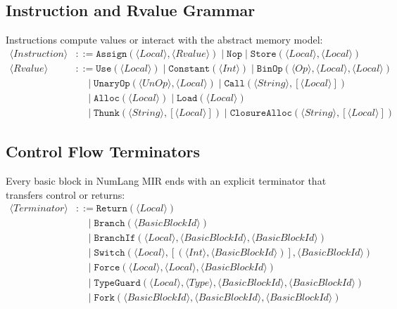 \subsection{Instruction and Rvalue Grammar}
Instructions compute values or interact with the abstract memory model:
\begin{align*}
\langle Instruction \rangle &::= \mathtt{Assign}(\langle Local \rangle, \langle Rvalue \rangle) \mid \mathtt{Nop} \mid \mathtt{Store}(\langle Local \rangle, \langle Local \rangle) \\
\langle Rvalue \rangle &::= \mathtt{Use}(\langle Local \rangle) \mid \mathtt{Constant}(\langle Int \rangle) \mid \mathtt{BinOp}(\langle Op \rangle, \langle Local \rangle, \langle Local \rangle) \\
&\quad\mid \mathtt{UnaryOp}(\langle UnOp \rangle, \langle Local \rangle) \mid \mathtt{Call}(\langle String \rangle, [\langle Local \rangle]) \\
&\quad\mid \mathtt{Alloc}(\langle Local \rangle) \mid \mathtt{Load}(\langle Local \rangle) \\
&\quad\mid \mathtt{Thunk}(\langle String \rangle, [\langle Local \rangle]) \mid \mathtt{ClosureAlloc}(\langle String \rangle, [\langle Local \rangle])
\end{align*}

\subsection{Control Flow Terminators}
Every basic block in NumLang MIR ends with an explicit terminator that transfers control or returns:
\begin{align*}
\langle Terminator \rangle &::= \mathtt{Return}(\langle Local \rangle) \\
&\quad\mid \mathtt{Branch}(\langle BasicBlockId \rangle) \\
&\quad\mid \mathtt{BranchIf}(\langle Local \rangle, \langle BasicBlockId \rangle, \langle BasicBlockId \rangle) \\
&\quad\mid \mathtt{Switch}(\langle Local \rangle, [(\langle Int \rangle, \langle BasicBlockId \rangle)], \langle BasicBlockId \rangle) \\
&\quad\mid \mathtt{Force}(\langle Local \rangle, \langle Local \rangle, \langle BasicBlockId \rangle) \\
&\quad\mid \mathtt{TypeGuard}(\langle Local \rangle, \langle Type \rangle, \langle BasicBlockId \rangle, \langle BasicBlockId \rangle) \\
&\quad\mid \mathtt{Fork}(\langle BasicBlockId \rangle, \langle BasicBlockId \rangle, \langle BasicBlockId \rangle)
\end{align*}


